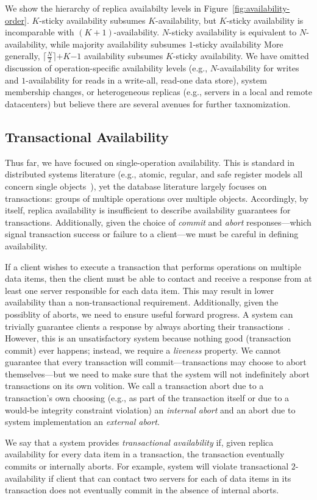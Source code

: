 We show the hierarchy of replica availabilty levels in
Figure~\ref{fig:availability-order}. $K$-sticky availability subsumes
$K$-availability, but $K$-sticky availability is incomparable with
$(K+1)$-availability. $N$-sticky availability is equivalent to
$N$-availability, while majority availability subsumes $1$-sticky
availability More generally, $\lceil \frac{N}{2} \rceil$$+$$K$$-$$1$
availability subsumes $K$-sticky availability. We have omitted
discussion of operation-specific availability levels (e.g.,
$N$-availability for writes and $1$-availability for reads in a
write-all, read-one data store), system membership changes, or
heterogeneous replicas (e.g., servers in a local and remote
datacenters) but believe there are several avenues for further
taxnomization.

\subsection{Transactional Availability}

Thus far, we have focused on single-operation availability. This is
standard in distributed systems literature (e.g., atomic, regular, and
safe register models all concern single objects~\cite{herlihy-art}),
yet the database literature largely focuses on transactions: groups of
multiple operations over multiple objects. Accordingly, by itself,
replica availability is insufficient to describe availability
guarantees for transactions. Additionally, given the choice of
\textit{commit} and \textit{abort} responses---which signal
transaction success or failure to a client---we must be careful in
defining availability.

If a client wishes to execute a transaction that performs operations
on multiple data items, then the client must be able to contact and
receive a response from at least one server responsible for each data
item. This may result in lower availability than a non-transactional
requirement. Additionally, given the possiblity of aborts, we need to
ensure useful forward progress. A system can trivially guarantee
clients a response by always aborting their
transactions~\cite{transaction-liveness}. However, this is an
unsatisfactory system because nothing good (transaction commit) ever
happens; instead, we require a \textit{liveness} property. We cannot
guarantee that every transaction will commit---transactions may choose
to abort themselves---but we need to make sure that the system will
not indefinitely abort transactions on its own volition. We call a
transaction abort due to a transaction's own choosing (e.g., as part
of the transaction itself or due to a would-be integrity constraint
violation) an \textit{internal abort} and an abort due to system
implementation an \textit{external abort}.

We say that a system provides \textit{transactional availability} if,
given replica availability for every data item in a transaction, the
transaction eventually commits or internally aborts. For example,
system will violate transactional $2$-availability if client that can
contact two servers for each of data items in its transaction does not
eventually commit in the absence of internal aborts.

